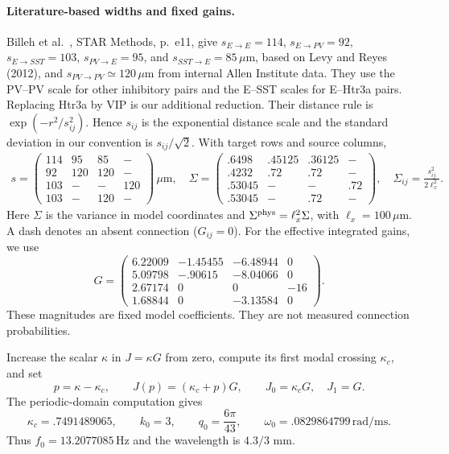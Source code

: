 \documentclass[11pt]{article}
\begin{document}
\paragraph{Literature-based widths and fixed gains.}
Billeh et al.~\cite{billeh2020}, STAR Methods, p.~e11, give
$s_{E\to E}=114$, $s_{E\to PV}=92$, $s_{E\to SST}=103$,
$s_{PV\to E}=95$, and $s_{SST\to E}=85\,\mu\mathrm m$, based on
Levy and Reyes (2012), and $s_{PV\to PV}\simeq120\,\mu\mathrm m$
from internal Allen Institute data. They use the PV--PV scale for other
inhibitory pairs and the E--SST scales for E--Htr3a pairs.
Replacing Htr3a by VIP is our additional reduction.
Their distance rule is $\exp(-r^2/s_{ij}^2)$. Hence $s_{ij}$ is the
exponential distance scale and the standard deviation in our convention
is $s_{ij}/\sqrt2$. With target rows and source columns,
\begin{equation}
 \begin{aligned}
 s=\begin{pmatrix}
 114&95&85&-\\92&120&120&-\\103&-&-&120\\103&-&120&-
 \end{pmatrix}\,\mu\mathrm m, \quad 
 \Sigma=\begin{pmatrix}
 .6498&.45125&.36125&-\\.4232&.72&.72&-\\
 .53045&-&-&.72\\.53045&-&.72&-
 \end{pmatrix},\quad
 \Sigma_{ij}=\frac{s_{ij}^2}{2\ell_x^2}.
 \end{aligned}
 \label{eq:v1-width-matrices}
\end{equation}
Here $\Sigma$ is the variance in model coordinates and
$\Sigma^{\rm phys}=\ell_x^2\Sigma$, with $\ell_x=100\,\mu\mathrm m$.
A dash denotes an absent connection ($G_{ij}=0$).
For the effective integrated gains, we use
\begin{equation}
 G=\begin{pmatrix}
 6.22009&-1.45455&-6.48944&0\\
 5.09798&-.90615&-8.04066&0\\
 2.67174&0&0&-16\\
 1.68844&0&-3.13584&0
 \end{pmatrix}.
 \label{eq:v1-gain-matrices}
\end{equation}
These magnitudes are fixed model coefficients. They are not measured
connection probabilities. 

Increase the scalar $\kappa$ in $J=\kappa G$ from zero, compute its first
modal crossing $\kappa_c$, and set
\begin{equation}
 p=\kappa-\kappa_c,\qquad J(p)=(\kappa_c+p)G,
 \qquad J_0=\kappa_cG,\quad J_1=G.
 \label{eq:v1-gain-parameter}
\end{equation}
The periodic-domain computation gives
\begin{equation}
 \kappa_c=.7491489065,\qquad k_0=3,\qquad
 q_0=\frac{6\pi}{43},\qquad
 \omega_0=.0829864799\,\mathrm{rad/ms}.
 \label{eq:v1-onset-values}
\end{equation}
Thus $f_0=13.2077085\,\mathrm{Hz}$ and the wavelength is $4.3/3$ mm.
\end{document}
